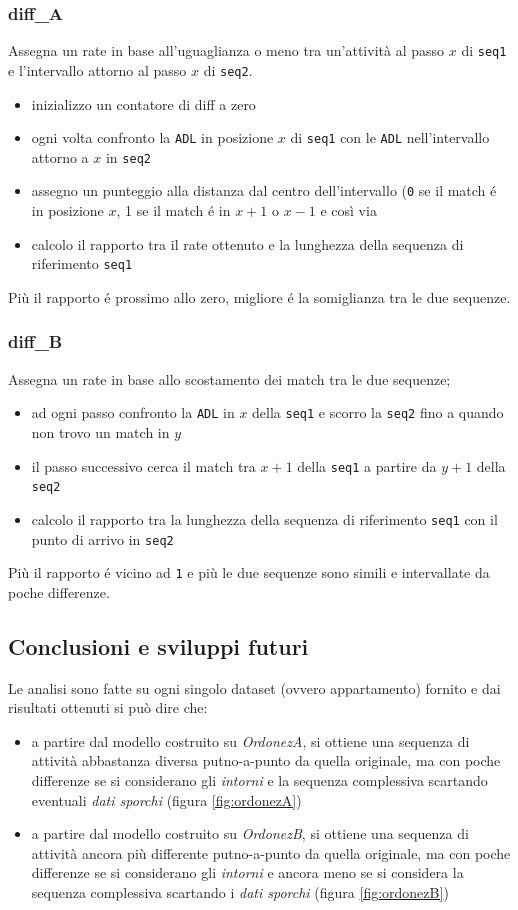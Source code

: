 \documentclass[12pt, a4paper]{scrartcl}
\begin{document}
\subsubsection*{diff\_A} 
Assegna un rate in base all'uguaglianza o meno tra un'attività al passo $x$ di \texttt{seq1} e l'intervallo attorno al passo $x$ di \texttt{seq2}.
\begin{itemize}
\item inizializzo un contatore di diff a zero
\item ogni volta confronto la \texttt{ADL} in posizione $x$ di \texttt{seq1} con le \texttt{ADL} nell'intervallo attorno a $x$ in \texttt{seq2}
\item assegno un punteggio alla distanza dal centro dell'intervallo (\texttt{0} se il match é in posizione $x$, 1 se il match é in $x+1$ o $x-1$ e così via 
\item calcolo il rapporto tra il rate ottenuto e la lunghezza della sequenza di riferimento \texttt{seq1}
\end{itemize}
Più il rapporto é prossimo allo zero, migliore é la somiglianza tra le due sequenze.

\subsubsection*{diff\_B}
Assegna un rate in base allo scostamento dei match tra le due sequenze;
\begin{itemize}
\item ad ogni passo confronto la \texttt{ADL} in $x$ della \texttt{seq1} e scorro la \texttt{seq2} fino a quando non trovo un match in $y$
\item il passo successivo cerca il match tra $x+1$ della \texttt{seq1} a partire da $y+1$ della \texttt{seq2}
\item calcolo il rapporto tra la lunghezza della sequenza di riferimento \texttt{seq1} con il punto di arrivo in \texttt{seq2}
\end{itemize}
Più il rapporto é vicino ad \texttt{1} e più le due sequenze sono simili e intervallate da poche differenze.

\subsection*{Conclusioni e sviluppi futuri}
Le analisi sono fatte su ogni singolo dataset (ovvero appartamento) fornito e dai risultati ottenuti si può dire che:
\begin{itemize}
\item a partire dal modello costruito su \emph{OrdonezA}, si ottiene una sequenza di attività abbastanza diversa putno-a-punto da quella originale, ma con poche differenze se si considerano gli \emph{intorni} e la sequenza complessiva scartando eventuali \emph{dati sporchi} (figura \ref{fig:ordonezA})
\item a partire dal modello costruito su \emph{OrdonezB}, si ottiene una sequenza di attività ancora più differente putno-a-punto da quella originale, ma con poche differenze se si considerano gli \emph{intorni} e ancora meno se si considera la sequenza complessiva scartando i \emph{dati sporchi} (figura \ref{fig:ordonezB})
\end{itemize}
\end{document}
